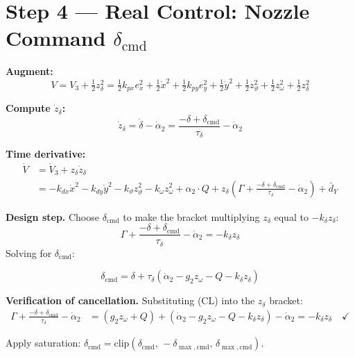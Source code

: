 \documentclass[11pt,a4paper]{article}
\theoremstyle{plain}
\theoremstyle{remark}
\newcommand{\vth}{\vartheta}
\newcommand{\zth}{z_{\vth}}
\newcommand{\zom}{z_{\omega}}
\newcommand{\zdel}{z_{\delta}}
\newcommand{\clip}{\mathrm{clip}}
\newcommand{\dcmd}{\delta_{\mathrm{cmd}}}
\begin{document}
\section{Step 4 --- Real Control: Nozzle Command \texorpdfstring{$\delta_{\mathrm{cmd}}$}{delta\_cmd}}

\textbf{Augment:}
\begin{equation}
  V = V_3 + \tfrac{1}{2}\zdel^2
  = \tfrac{1}{2}k_{px}e_x^2 + \tfrac{1}{2}\dot x^2 + \tfrac{1}{2}k_{py}e_y^2 + \tfrac{1}{2}\dot y^2 + \tfrac{1}{2}\zth^2 + \tfrac{1}{2}\zom^2 + \tfrac{1}{2}\zdel^2
  \tag{V4}
\end{equation}

\textbf{Compute $\dot\zdel$:}
\begin{equation}
  \dot\zdel = \dot\delta - \dot\alpha_2 = \frac{-\delta + \dcmd}{\tau_\delta} - \dot\alpha_2
  \tag{D4}
\end{equation}

\textbf{Time derivative:}
\begin{align*}
  \dot V &= \dot V_3 + \zdel\dot\zdel \\
  &= -k_{dx}\dot x^2 - k_{dy}\dot y^2 - k_\vth\zth^2 - k_\omega\zom^2 + \alpha_2\cdot Q
  + \zdel\!\left(\Gamma + \frac{-\delta + \dcmd}{\tau_\delta} - \dot\alpha_2\right) + \bar{d}_Y
\end{align*}

\textbf{Design step.} Choose $\dcmd$ to make the bracket multiplying $\zdel$ equal to $-k_\delta\zdel$:
\[
  \Gamma + \frac{-\delta + \dcmd}{\tau_\delta} - \dot\alpha_2 = -k_\delta\zdel
\]
Solving for $\dcmd$:

\begin{equation}
  \boxed{\dcmd = \delta + \tau_\delta\!\left(\dot\alpha_2 - g_2\zom - Q - k_\delta\zdel\right)}
  \tag{CL}
\end{equation}

\textbf{Verification of cancellation.} Substituting (CL) into the $\zdel$ bracket:
\begin{align*}
  \Gamma + \frac{-\delta + \dcmd}{\tau_\delta} - \dot\alpha_2
  &= (g_2\zom + Q) + (\dot\alpha_2 - g_2\zom - Q - k_\delta\zdel) - \dot\alpha_2
  = -k_\delta\zdel \quad \checkmark
\end{align*}

Apply saturation: $\dcmd = \clip(\dcmd,\,-\delta_{\max,\mathrm{cmd}},\,\delta_{\max,\mathrm{cmd}})$.
\end{document}
